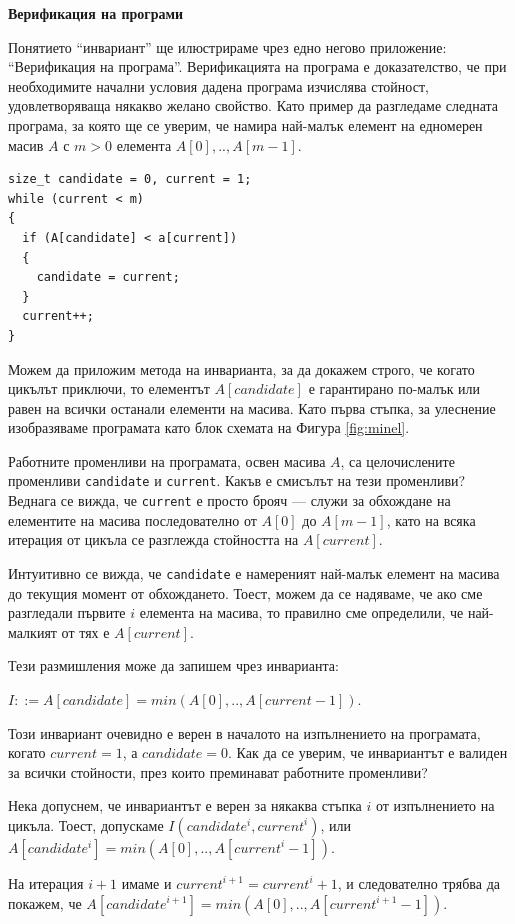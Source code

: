 \documentclass[12pt,a4paper]{article}
\newcommand{\code}[1]{\texttt{#1}}
\begin{document}
{\begin{mdframed}[hidealllines=true,backgroundcolor=gray!20]
\bigskip
\textbf{Верификация на програми}
\bigskip

Понятието ``инвариант'' ще илюстрираме чрез едно негово приложение: ``Верификация на програма''. Верификацията на програма е доказателство, че при необходимите начални условия дадена програма изчислява стойност, удовлетворяваща някакво желано свойство. Като пример да разгледаме следната  програма, за която ще се уверим, че намира най-малък елемент на едномерен масив $A$ с $m>0$ елемента $A[0],..,A[m-1]$.


\begin{verbatim}
size_t candidate = 0, current = 1;
while (current < m)
{
  if (A[candidate] < a[current])
  {
    candidate = current;
  }
  current++;
}
\end{verbatim}
Можем да приложим метода на инварианта, за да докажем строго, че когато цикълът приключи, то елементът $A[candidate]$ е гарантирано по-малък или равен на всички останали елементи на масива.
Като първа стъпка, за улеснение изобразяваме програмата като блок схемата на Фигура \ref{fig:minel}.


Работните променливи на програмата, освен масива $A$, са целочислените променливи \code{candidate} и \code{current}. Какъв е смисълът на тези променливи? Веднага се вижда, че \code{current} е просто брояч --- служи за обхождане на елементите на масива последователно от $A[0]$ до $A[m-1]$, като на всяка итерация от цикъла се разглежда стойността на $A[current]$.

Интуитивно се вижда, че \code{candidate} е намереният най-малък елемент на масива до текущия момент от обхождането. Тоест, можем да се надяваме, че ако сме разгледали първите $i$ елемента на масива, то правилно сме определили, че най-малкият от тях е $A[current]$.

Тези размишления може да запишем чрез инварианта:

$I ::= A[candidate]=min(A[0],..,A[current-1])$.

Този инвариант очевидно е верен в началото на изпълнението на програмата, когато $current=1$, а $candidate=0$. Как да се уверим, че инвариантът е валиден за всички стойности, през които преминават работните променливи?

Нека допуснем, че инвариантът е верен за някаква стъпка $i$ от изпълнението на цикъла. Тоест, допускаме $I(candidate^i, current^i)$, или $A[candidate^i]=min(A[0],..,A[current^i-1])$.

На итерация $i+1$ имаме  и $current^{i+1}=current^{i}+1$, и следователно трябва да покажем, че $A[candidate^{i+1}]=min(A[0],..,A[current^{i+1}-1])$.


\end{mdframed}}
\end{document}
